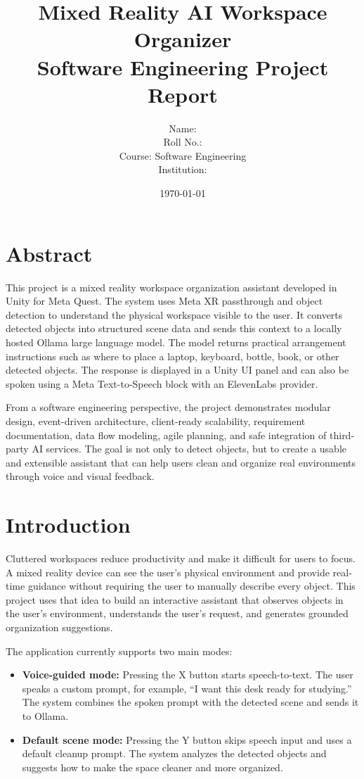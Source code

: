 \documentclass[12pt,a4paper]{article}
\title{\textbf{Mixed Reality AI Workspace Organizer}\\
\large Software Engineering Project Report}
\author{
    Name: \underline{\hspace{5cm}}\\
    Roll No.: \underline{\hspace{4.7cm}}\\
    Course: Software Engineering\\
    Institution: \underline{\hspace{4.2cm}}
}
\date{\today}
\begin{document}
\maketitle
\newpage

\tableofcontents
\newpage

\section{Abstract}

This project is a mixed reality workspace organization assistant developed in Unity for Meta Quest. The system uses Meta XR passthrough and object detection to understand the physical workspace visible to the user. It converts detected objects into structured scene data and sends this context to a locally hosted Ollama large language model. The model returns practical arrangement instructions such as where to place a laptop, keyboard, bottle, book, or other detected objects. The response is displayed in a Unity UI panel and can also be spoken using a Meta Text-to-Speech block with an ElevenLabs provider.

From a software engineering perspective, the project demonstrates modular design, event-driven architecture, client-ready scalability, requirement documentation, data flow modeling, agile planning, and safe integration of third-party AI services. The goal is not only to detect objects, but to create a usable and extensible assistant that can help users clean and organize real environments through voice and visual feedback.

\section{Introduction}

Cluttered workspaces reduce productivity and make it difficult for users to focus. A mixed reality device can see the user's physical environment and provide real-time guidance without requiring the user to manually describe every object. This project uses that idea to build an interactive assistant that observes objects in the user's environment, understands the user's request, and generates grounded organization suggestions.

The application currently supports two main modes:

\begin{itemize}
    \item \textbf{Voice-guided mode:} Pressing the X button starts speech-to-text. The user speaks a custom prompt, for example, ``I want this desk ready for studying.'' The system combines the spoken prompt with the detected scene and sends it to Ollama.
    \item \textbf{Default scene mode:} Pressing the Y button skips speech input and uses a default cleanup prompt. The system analyzes the detected objects and suggests how to make the space cleaner and more organized.
\end{itemize}
\end{document}
